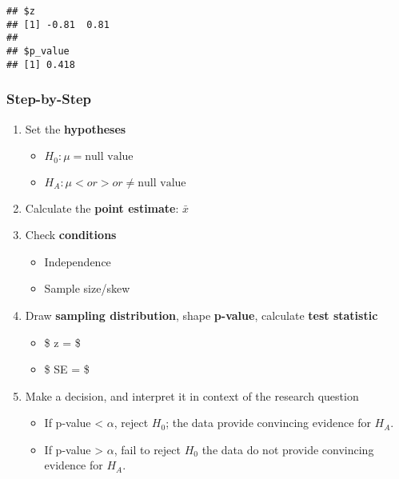 \documentclass[]{book}
\providecommand{\tightlist}{%
  \setlength{\itemsep}{0pt}\setlength{\parskip}{0pt}}
\begin{document}
\begin{verbatim}
## $z
## [1] -0.81  0.81
## 
## $p_value
## [1] 0.418
\end{verbatim}

\hypertarget{step-by-step}{%
\subsubsection*{Step-by-Step}\label{step-by-step}}

\begin{enumerate}
\def\labelenumi{\arabic{enumi}.}
\tightlist
\item
  Set the \textbf{hypotheses}

  \begin{itemize}
  \tightlist
  \item
    \(H_0 : \mu = \text{null value}\)
  \item
    \(H_A: \mu < or > or \neq \text{null value}\)
  \end{itemize}
\item
  Calculate the \textbf{point estimate}: \(\bar{x}\)
\item
  Check \textbf{conditions}

  \begin{itemize}
  \tightlist
  \item
    Independence
  \item
    Sample size/skew
  \end{itemize}
\item
  Draw \textbf{sampling distribution}, shape \textbf{p-value}, calculate \textbf{test statistic}

  \begin{itemize}
  \tightlist
  \item
    \$ z =  \$
  \item
    \$ SE =  \$
  \end{itemize}
\item
  Make a decision, and interpret it in context of the research question

  \begin{itemize}
  \tightlist
  \item
    If p-value \textless{} \(\alpha\), reject \(H_0\); the data provide convincing evidence for \(H_A\).
  \item
    If p-value \textgreater{} \(\alpha\), fail to reject \(H_0\) the data do not provide convincing evidence for \(H_A\).
  \end{itemize}
\end{enumerate}
\end{document}
